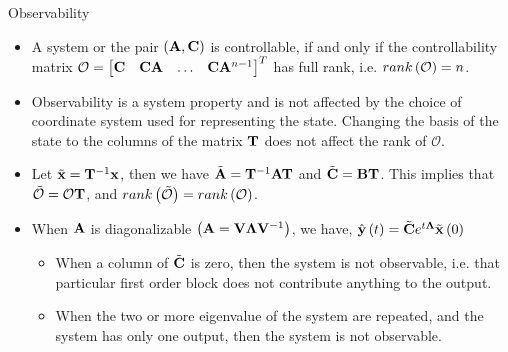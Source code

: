 \documentclass[aspectratio=169]{beamer}
\def\mf{\ensuremath\mathbf}
\def\lp{\ensuremath\left(}
\def\rp{\ensuremath\right)}
\def\bmx{\ensuremath\begin{bmatrix*}[r]}
\def\emx{\ensuremath\end{bmatrix*}}
\newcommand{\ct}[1]{\lp #1\rp}
\begin{document}
\begin{frame}[t]{Observability}
\begin{itemize}
    \item A system or the pair $\ct{\mf{A}, \mf{C}}$ is controllable, if and only if the controllability matrix $\mathcal{O} = \bmx \mf{C} & \mf{C}\mf{A} & \ldots & \mf{C}\mf{A}^{n-1} \emx^T$ has full rank, i.e. $rank\ct{\mathcal{O}} = n$.

    \item Observability is a system property and is not affected by the choice of coordinate system used for representing the state. Changing the basis of the state to the columns of the matrix $\mf{T}$ does not affect the rank of $\mathcal{O}$.

    \item Let $\tilde{\mf{x}} = \mf{T}^{-1}\mf{x}$, then we have $\tilde{\mf{A}} = \mf{T}^{-1}\mf{A}\mf{T}$ and $\tilde{\mf{C}} = \mf{B}\mf{T}$. This implies that $\tilde{\mathcal{O}} = \mathcal{O}\mf{T}$, and $rank\ct{\tilde{\mathcal{O}}} = rank\ct{\mathcal{O}}$.

    \item When $\mf{A}$ is diagonalizable $\ct{\mf{A} = \mf{V}\mf{\Lambda}\mf{V}^{-1}}$, we have, $\hat{\mf{y}}\ct{t} = \tilde{\mf{C}}e^{t\mf{\Lambda}}\tilde{\mf{x}}\ct{0}$

    \begin{itemize}
        \item When a column of $\tilde{\mf{C}}$ is zero, then the system is not observable, i.e. that particular first order block does not contribute anything to the output.\vspace{0.2cm}

        \item When the two or more eigenvalue of the system are repeated, and the system has only one output, then the system is not observable.
    \end{itemize}
\end{itemize}
\end{frame}
\end{document}
